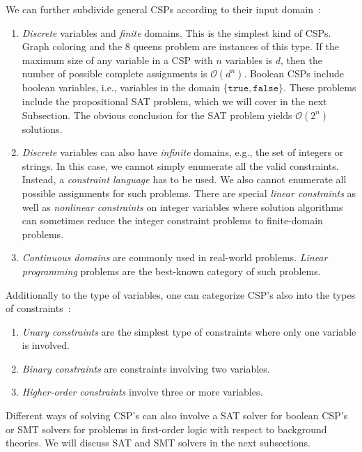 We can further subdivide general CSPs according to their input domain~\cite{csp}:
\begin{enumerate}
 \item \emph{Discrete} variables and \emph{finite} domains. This is the simplest kind of CSPs. Graph coloring and the 8 queens problem are instances of this type. If the maximum size of any variable in a CSP with $n$ variables is $d$, then the number of possible complete assignments is $\mathcal{O}(d^n)$. Boolean CSPs include boolean variables, i.e., variables in the domain $\{\mathtt{true}, \mathtt{false}\}$. These problems include the propositional SAT problem, which we will cover in the next Subsection. The obvious conclusion for the SAT problem yields $\mathcal{O}(2^n)$ solutions.
 
 \item \emph{Discrete} variables can also have \emph{infinite} domains, e.g., the set of integers or strings. In this case, we cannot simply enumerate all the valid constraints. Instead, a \emph{constraint language} has to be used. We also cannot enumerate all possible assignments for such problems. There are special \emph{linear constraints} as well as \emph{nonlinear constraints} on integer variables where solution algorithms can sometimes reduce the integer constraint problems to finite-domain problems. 
 
 \item \emph{Continuous domains} are commonly used in real-world problems. \emph{Linear programming} problems are the best-known category of such problems. 
\end{enumerate}

Additionally to the type of variables, one can categorize CSP's also into the types of constraints~\cite{csp}:
\begin{enumerate}
 \item \emph{Unary constraints} are the simplest type of constraints where only one variable is involved. 
 \item \emph{Binary constraints} are constraints involving two variables. 
 \item \emph{Higher-order constraints} involve three or more variables. 
\end{enumerate}

Different ways of solving CSP's can also involve a SAT solver for boolean CSP's or SMT solvers for problems in first-order logic with respect to background theories. We will discuss SAT and SMT solvers in the next subsections.

